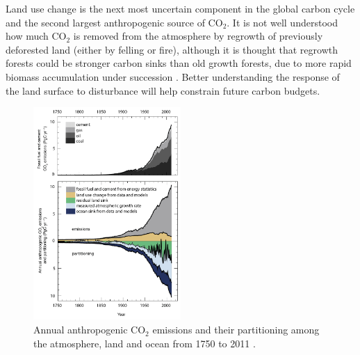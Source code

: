 \documentclass[11pt]{article}
\begin{document}
Land use change is the next most uncertain component in the global carbon cycle and the second largest anthropogenic source of CO\(_{2}\). It is not well understood how much CO\(_{2}\) is removed from the atmosphere by regrowth of previously deforested land (either by felling or fire), although it is thought that regrowth forests could be stronger carbon sinks than old growth forests, due to more rapid biomass accumulation under succession \citep{pan2011large}. Better understanding the response of the land surface to disturbance will help constrain future carbon budgets. 





\begin{figure}[ht]
    \centering
    \includegraphics[width=0.5\textwidth]{ipcc_fig6_8.jpg}
    \caption{Annual anthropogenic CO\(_{2}\) emissions and their partitioning among the atmosphere, land and ocean from 1750 to 2011  \citep{ciais2014carbon}.}
    \label{fig:ipcc_fig6.8}
\end{figure}
\end{document}
